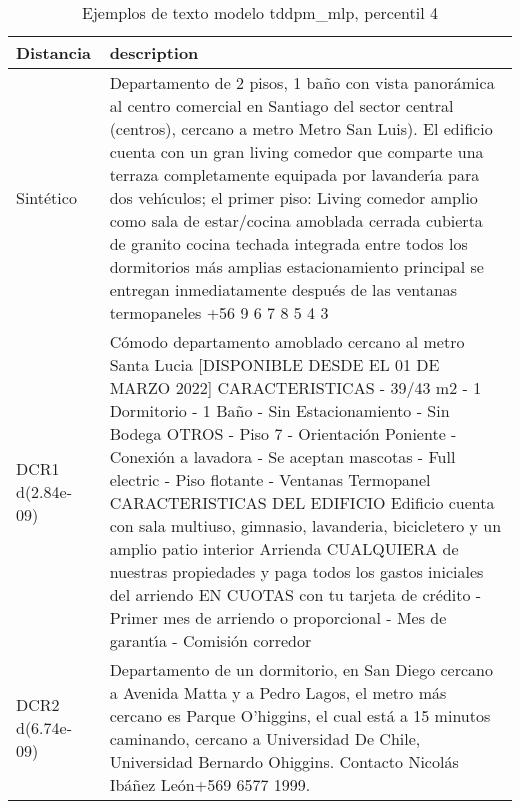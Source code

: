 \begin{table}[H]
\centering
\fontsize{10}{14}\selectfont
\caption{Ejemplos de texto modelo tddpm\_mlp, percentil 4}
\label{table-example-economicos-a-1-tddpm_mlp-4p-text}
\begin{tabular}{|l|m{35em}|}
\hline
\rowcolor[gray]{0.8}
Distancia & description \\
\hline Sintético & Departamento de 2 pisos, 1 ba\~no con vista panor\'amica al centro comercial en Santiago del sector central (centros), cercano a metro Metro San Luis). El edificio cuenta con un gran living comedor que comparte una terraza completamente equipada por lavander{\'\i}a para dos veh{\'\i}culos; el primer piso: Living comedor amplio como sala de estar/cocina amoblada cerrada cubierta de granito cocina techada integrada entre todos los dormitorios m\'as amplias estacionamiento principal se entregan inmediatamente despu\'es de las ventanas termopaneles +56 9 6 7 8 5 4 3 \\
\hline DCR1 d(2.84e-09) & C\'omodo departamento amoblado cercano al metro Santa Lucia  [DISPONIBLE DESDE EL 01 DE MARZO 2022]  CARACTERISTICAS - 39/43 m2 - 1 Dormitorio - 1 Ba\~no - Sin Estacionamiento - Sin Bodega  OTROS - Piso 7 - Orientaci\'on Poniente - Conexi\'on a lavadora - Se aceptan mascotas - Full electric  - Piso flotante - Ventanas Termopanel  CARACTERISTICAS DEL EDIFICIO Edificio cuenta con sala multiuso, gimnasio, lavanderia, bicicletero y un amplio patio interior  Arrienda CUALQUIERA de nuestras propiedades y paga todos los gastos iniciales del arriendo EN CUOTAS con tu tarjeta de cr\'edito - Primer mes de arriendo o proporcional - Mes de garant{\'\i}a - Comisi\'on corredor \\
\hline DCR2 d(6.74e-09) & Departamento de un dormitorio, en San Diego cercano a Avenida Matta y a Pedro Lagos, el metro m\'as cercano es Parque O'higgins, el cual est\'a a 15 minutos caminando, cercano a Universidad De Chile, Universidad Bernardo Ohiggins. Contacto Nicol\'as Ib\'a\~nez Le\'on+569 6577 1999. \\
\hline
\end{tabular}
\end{table}
